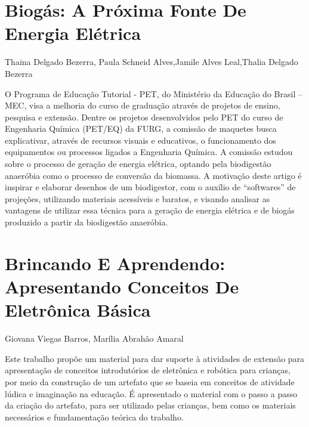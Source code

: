 


\section*{Biogás: A Próxima Fonte De Energia Elétrica}

Thaina Delgado Bezerra, Paula Schneid Alves,Jamile Alves Leal,Thalia Delgado Bezerra

O Programa de Educação Tutorial - PET, do Ministério da Educação do Brasil – MEC, visa a melhoria do curso de graduação através de projetos de ensino, pesquisa e extensão. Dentre os projetos desenvolvidos pelo PET do curso de Engenharia Química (PET/EQ) da FURG, a comissão de maquetes busca explicativar, através de recursos visuais e educativos, o funcionamento dos equipamentos ou processos ligados a Engenharia Química. A comissão estudou sobre o processo de geração de energia elétrica, optando pela biodigestão anaeróbia como o processo de conversão da biomassa. A motivação deste artigo é inspirar e elaborar desenhos de um biodigestor, com o auxílio de “softwares” de projeções, utilizando materiais acessíveis e baratos, e visando analisar as vantagens de utilizar essa técnica para a geração de energia elétrica e de biogás produzido a partir da biodigestão anaeróbia.





\section*{Brincando E Aprendendo: Apresentando Conceitos De Eletrônica Básica}

Giovana Viegas Barros, Marília Abrahão Amaral

Este trabalho propõe um material para dar suporte à atividades de extensão para apresentação de conceitos introdutórios de eletrônica e robótica para crianças, por meio da construção de um artefato que se baseia em conceitos de atividade lúdica e imaginação na educação. É apresentado o material com o passo a passo da criação do artefato, para ser utilizado pelas crianças, bem como os materiais necessários e fundamentação teórica do trabalho.



